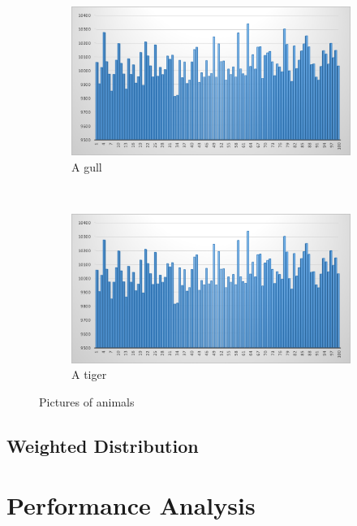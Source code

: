 \documentclass[12pt,a4paper,article]{memoir} %
\begin{document}
\begin{figure}[h!]
    \begin{subfigure}[b]{0.45\textwidth}
        \includegraphics[width=\textwidth]{img/uni-m-1.png}
        \caption{A gull}
        \label{fig:gull}
    \end{subfigure}
    ~ %
    \begin{subfigure}[b]{0.45\textwidth}
        \includegraphics[width=\textwidth]{img/uni-m-1.png}
        \caption{A tiger}
        \label{fig:tiger}
    \end{subfigure}
    \caption{Pictures of animals}\label{fig:animals}
\end{figure}


\subsection{Weighted Distribution}

\section{Performance Analysis}
\end{document}
